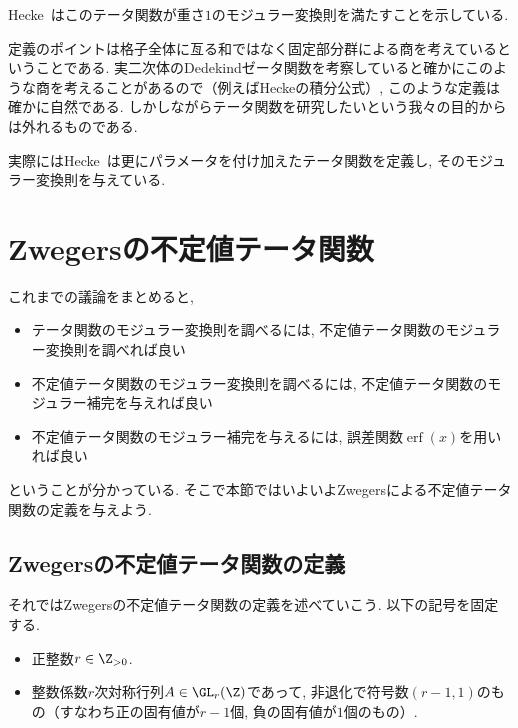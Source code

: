 \documentclass[11pt,b5paper,oneside,lualatex]{ltjsarticle} %
\DeclareMathOperator{\erf}{erf}
\numberwithin{equation}{section} %
\begin{document}
Hecke~\cite[Satz 7]{Hecke}はこのテータ関数が重さ$ 1 $のモジュラー変換則を満たすことを示している. 

定義のポイントは格子全体に亙る和ではなく固定部分群による商を考えているということである. 
実二次体のDedekindゼータ関数を考察していると確かにこのような商を考えることがあるので（例えばHeckeの積分公式）, このような定義は確かに自然である. 
しかしながらテータ関数を研究したいという我々の目的からは外れるものである. 

\begin{rem}
	実際にはHecke~\cite{Hecke}は更にパラメータを付け加えたテータ関数を定義し, そのモジュラー変換則を与えている. 
\end{rem}



\section{Zwegersの不定値テータ関数} \label{sec:Zwegers_theta}


これまでの議論をまとめると, 
\begin{itemize}
	\item {}テータ関数のモジュラー変換則を調べるには, 不定値テータ関数のモジュラー変換則を調べれば良い
	\item 不定値テータ関数のモジュラー変換則を調べるには, 不定値テータ関数のモジュラー補完を与えれば良い
	\item 不定値テータ関数のモジュラー補完を与えるには, 誤差関数$ \erf(x) $を用いれば良い
\end{itemize}
ということが分かっている. 
そこで本節ではいよいよZwegersによる不定値テータ関数の定義を与えよう. 


\subsection{Zwegersの不定値テータ関数の定義} \label{subsec:Zwegers_theta_def}


それではZwegersの不定値テータ関数の定義を述べていこう. 
以下の記号を固定する. 

\begin{symb}
	\begin{itemize}
		\item 正整数$ r \in \Z_{>0} $.
		\item 整数係数$ r $次対称行列$ A \in \GL_r(\Z) $であって, 非退化で符号数$ (r-1, 1) $のもの（すなわち正の固有値が$ r-1 $個, 負の固有値が$ 1 $個のもの）.
	\end{itemize}
\end{symb}
\end{document}

